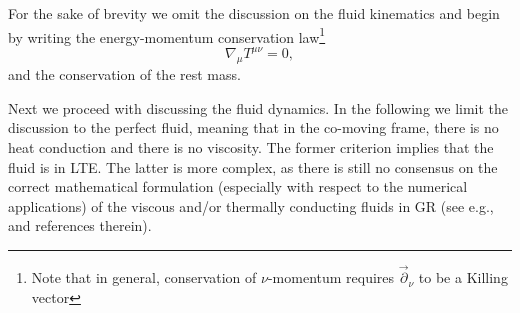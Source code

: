 For the sake of brevity we omit the discussion 
on the fluid kinematics and 
begin by writing the energy-momentum conservation law\footnote{
    Note that in general, conservation of 
    $\nu$-momentum requires 
    $\vec{\partial}_{\nu}$ to be a Killing vector
} 
%
\begin{equation}
    \nabla_{\mu}{T^{\mu\nu}} = 0,
    \label{eq:theory:tmunu_eq_0}
\end{equation}
%
and the conservation of the rest mass. 

Next we proceed with discussing the fluid dynamics. 
%
In the following we limit the discussion to the perfect fluid, meaning that in the co-moving frame, 
there is no heat conduction and there is no viscosity. The former criterion implies that the fluid is in 
\ac{LTE}. The latter is more complex, as there is still no consensus on the correct mathematical formulation 
(especially with respect to the numerical applications) of the viscous and/or thermally conducting fluids in 
\ac{GR} (see e.g., \citet{Andersson:2006nr} and references therein). 

